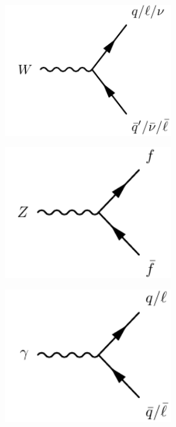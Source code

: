 \begin{figure}
	\centering
	\begin{subfigure}[b]{0.33\linewidth}
		\centering\includegraphics[width=0.8\textwidth]{w_fermion_vertex}
	\end{subfigure}%
	\begin{subfigure}[b]{0.33\linewidth}
		\centering\includegraphics[width=0.8\textwidth]{z_fermion_vertex}
	\end{subfigure}	
	\begin{subfigure}[b]{0.33\linewidth}
		\centering\includegraphics[width=0.8\textwidth]{gamma_fermion_vertex}

\end{subfigure}
\end{figure}
